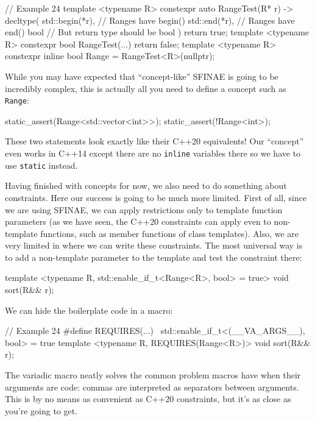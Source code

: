 \begin{code}
// Example 24
template <typename R>
constexpr auto RangeTest(R* r) -> decltype(
  std::begin(*r),    // Ranges have begin()
  std::end(*r),         // Ranges have end()
  bool{}            // But return type should be bool
) { return true; }
template <typename R> constexpr bool RangeTest(...) {
  return false;
}
template <typename R>
constexpr inline bool Range = RangeTest<R>(nullptr);
\end{code}

While you may have expected that ``concept-like'' SFINAE is going to be incredibly complex, this is actually all you need to define a concept such as \texttt{Range}:

\begin{code}
static_assert(Range<std::vector<int>>);
static_assert(!Range<int>);
\end{code}

These two statements look exactly like their C++20 equivalents! Our ``concept'' even works in C++14 except there are no \texttt{inline} variables there so we have to use \texttt{static} instead.

Having finished with concepts for now, we also need to do something about constraints. Here our success is going to be much more limited. First of all, since we are using SFINAE, we can apply restrictions only to template function parameters (as we have seen, the C++20 constraints can apply even to non-template functions, such as member functions of class templates). Also, we are very limited in where we can write these constraints. The most universal way is to add a non-template parameter to the template and test the constraint there:

\begin{code}
template <typename R,
    std::enable_if_t<Range<R>, bool> = true>
void sort(R&& r);
\end{code}

We can hide the boilerplate code in a macro:

\begin{code}
// Example 24
#define REQUIRES(...) \
  std::enable_if_t<(__VA_ARGS__), bool> = true
template <typename R, REQUIRES(Range<R>)> void sort(R&& r);
\end{code}

The variadic macro neatly solves the common problem macros have when their arguments are code: commas are interpreted as separators between arguments. This is by no means as convenient as C++20 constraints, but it's as close as you're going to get.

